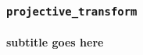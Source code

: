 \documentclass{beamer}
\begin{document}
\begin{frame}
  \frametitle{{\tt projective\_transform}}
  \framesubtitle{subtitle goes here}
\end{frame}
\end{document}
